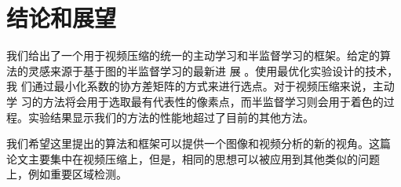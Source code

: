 \chapter{结论和展望}

我们给出了一个用于视频压缩的统一的主动学习和半监督学习的框架。给定的算
法的灵感来源于基于图的半监督学习的最新进
展 \cite{Manifold-Regularization-Journal}。使用最优化实验设计的技术，我
们通过最小化系数的协方差矩阵的方式来进行选点。对于视频压缩来说，主动学
习的方法将会用于选取最有代表性的像素点，而半监督学习则会用于着色的过
程。实验结果显示我们的方法的性能地超过了目前的其他方法。

我们希望这里提出的算法和框架可以提供一个图像和视频分析的新的视角。这篇
论文主要集中在视频压缩上，但是，相同的思想可以被应用到其他类似的问题
上，例如重要区域检测。

